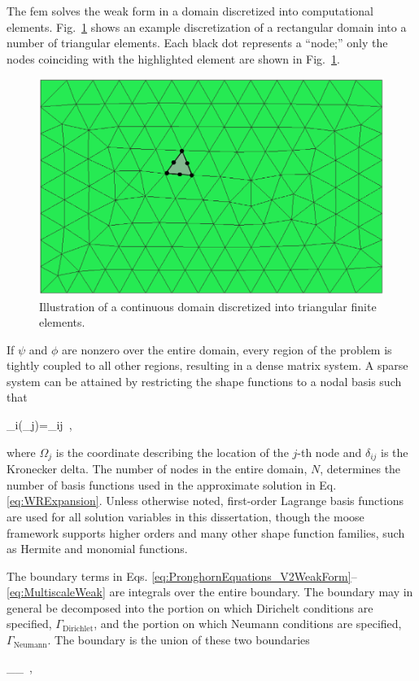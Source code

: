 The \gls{fem} solves the weak form in a domain discretized into computational elements. Fig.\ \ref{fig:fe_mesh} shows an example discretization of a rectangular domain into a number of triangular elements. Each black dot represents a ``node;'' only the nodes coinciding with the highlighted element are shown in Fig.\ \ref{fig:fe_mesh}.

\begin{figure}[!h]
\centering
\includegraphics[width=0.45\linewidth]{figs/fe_mesh.png}
\caption{Illustration of a continuous domain discretized into triangular finite elements.}
\label{fig:fe_mesh}
\end{figure}

If \(\psi\) and \(\phi\) are nonzero over the entire domain, every region of the problem is tightly coupled to all other regions, resulting in a dense matrix system. A sparse system can be attained by restricting the shape functions to a nodal basis such that

\beq
\label{eq:Nodal}
\phi_i(\Omega_j)=\delta_{ij}\ ,
\eeq

\noindent where \(\Omega_j\) is the coordinate describing the location of the \(j\)-th node and \(\delta_{ij}\) is the Kronecker delta. The number of nodes in the entire domain, \(N\), determines the number of basis functions used in the approximate solution in Eq. \eqref{eq:WRExpansion}. Unless otherwise noted, first-order Lagrange basis functions are used for all solution variables in this dissertation, though the \gls{moose} framework supports higher orders and many other shape function families, such as Hermite and monomial functions.

The boundary terms in Eqs. \eqref{eq:PronghornEquations_V2WeakForm}--\eqref{eq:MultiscaleWeak} are integrals over the entire boundary. The boundary may in general be decomposed into the portion on which Dirichelt conditions are specified, \(\Gamma_\text{Dirichlet}\), and the portion on which Neumann conditions are specified, \(\Gamma_\text{Neumann}\). The boundary is the union of these two boundaries

\beq
\Gamma\equiv\Gamma_\cup\Gamma_\ ,
\eeq

